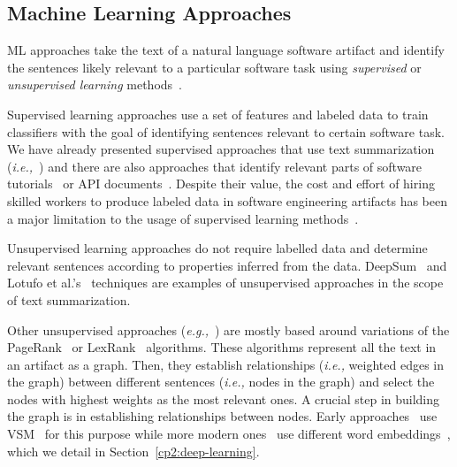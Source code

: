 \subsection{Machine Learning Approaches}
\label{cp2:machine-learning}


\acf{ML} approaches take the text of a natural language software artifact and identify 
the sentences likely relevant to a particular software task using \textit{supervised} or 
\textit{unsupervised learning} methods~\cite{zhang2005machine}.



Supervised learning approaches use a set of features and labeled data
 to train classifiers with the goal of identifying sentences relevant to 
 certain software task.
We have already presented supervised approaches that use text summarization (\textit{i.e.,}~\cite{Rastkar2010})
and there are also approaches that identify relevant 
parts of software tutorials~\cite{Jiang2016b}
or API documents~\cite{fucci2019, Maalej2013}.
Despite their value, 
the cost and effort of hiring skilled workers to produce 
labeled data in software engineering artifacts 
has been a major limitation 
to the usage of supervised learning 
methods~\cite{Arpteg2018}.





Unsupervised learning approaches do not require labelled data and determine 
relevant sentences according to properties inferred from the data. 
DeepSum~\cite{Li2018} and Lotufo et al.'s~\cite{Lotufo2012} techniques are examples of 
unsupervised approaches in the scope of text summarization. 



Other unsupervised approaches 
(\textit{e.g.,}~\cite{Jiang2017, Ponzanelli2015,  Ponzanelli2017})
are mostly based around variations of the PageRank~\cite{Page1999} or LexRank~\cite{Erkan2004} algorithms. 
These algorithms represent all the text in an artifact as a graph.
Then, they establish relationships (\textit{i.e.,} weighted edges in the graph) 
between different sentences (\textit{i.e.,} nodes in the graph) 
and select the nodes with highest weights as the most relevant ones.
A crucial step in building the graph is in  
establishing  relationships between nodes.
Early approaches~\cite{Lotufo2012, Jiang2017} 
use \ac{VSM}~\cite{Salton1975vsm} 
for this purpose while more modern ones~\cite{Huang2018, silva2019}
use different word embeddings~\cite{Mikolov2013, bojanowski2017FastText},
which we detail in Section~\ref{cp2:deep-learning}.








